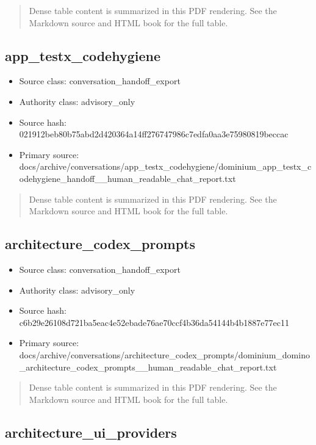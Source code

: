 \documentclass[11pt,a4paper]{report}
\begin{document}
\begin{quote}\small Dense table content is summarized in this PDF rendering. See the Markdown source and HTML book for the full table.\end{quote}

\subsection{app\_testx\_codehygiene}

\begin{itemize}
\item Source class: conversation\_handoff\_export
\item Authority class: advisory\_only
\item Source hash: 021912beb80b75abd2d420364a14ff276747986c7edfa0aa3e75980819beccac
\item Primary source: docs/archive/conversations/app\_testx\_codehygiene/dominium\_app\_testx\_codehygiene\_handoff\_\_human\_readable\_chat\_report.txt
\end{itemize}

\begin{quote}\small Dense table content is summarized in this PDF rendering. See the Markdown source and HTML book for the full table.\end{quote}

\subsection{architecture\_codex\_prompts}

\begin{itemize}
\item Source class: conversation\_handoff\_export
\item Authority class: advisory\_only
\item Source hash: c6b29e26108d721ba5eac4e52ebade76ae70ccf4b36da54144b4b1887e77ec11
\item Primary source: docs/archive/conversations/architecture\_codex\_prompts/dominium\_domino\_architecture\_codex\_prompts\_\_human\_readable\_chat\_report.txt
\end{itemize}

\begin{quote}\small Dense table content is summarized in this PDF rendering. See the Markdown source and HTML book for the full table.\end{quote}

\subsection{architecture\_ui\_providers}
\end{document}

